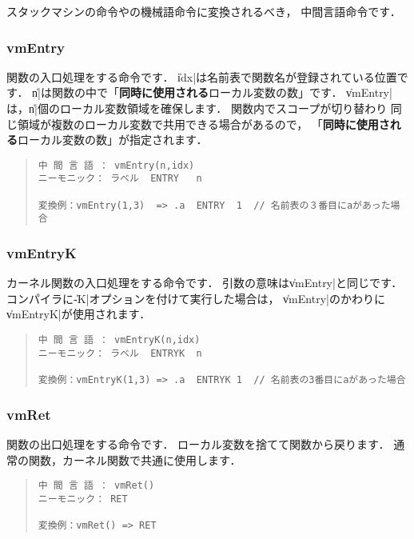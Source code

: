 スタックマシンの命令や\tac の機械語命令に変換されるべき，
中間言語命令です．

\subsubsection{vmEntry}

関数の入口処理をする命令です．
\|idx|は名前表で関数名が登録されている位置です．
\|n|は関数の中で「{\bf 同時に使用される}ローカル変数の数」です．
\|vmEntry|は，\|n|個のローカル変数領域を確保します．
関数内でスコープが切り替わり
同じ領域が複数のローカル変数で共用できる場合があるので，
「{\bf 同時に使用される}ローカル変数の数」が指定されます．

\begin{quote}
\begin{verbatim}
中 間 言 語 ： vmEntry(n,idx)
ニーモニック： ラベル  ENTRY   n

変換例：vmEntry(1,3)  => .a  ENTRY  1  // 名前表の３番目にaがあった場合
\end{verbatim}
\end{quote}

\subsubsection{vmEntryK}

カーネル関数の入口処理をする命令です．
引数の意味は\|vmEntry|と同じです．
\cmm コンパイラに\|-K|オプションを付けて実行した場合は，
\|vmEntry|のかわりに\|vmEntryK|が使用されます．

\begin{quote}
\begin{verbatim}
中 間 言 語 ： vmEntryK(n,idx)
ニーモニック： ラベル  ENTRYK  n

変換例：vmEntryK(1,3) => .a  ENTRYK 1  // 名前表の3番目にaがあった場合
\end{verbatim}
\end{quote}

\subsubsection{vmRet}

関数の出口処理をする命令です．
ローカル変数を捨てて関数から戻ります．
通常の関数，カーネル関数で共通に使用します．

\begin{quote}
\begin{verbatim}
中 間 言 語 ： vmRet()
ニーモニック： RET

変換例：vmRet() => RET
\end{verbatim}
\end{quote}


